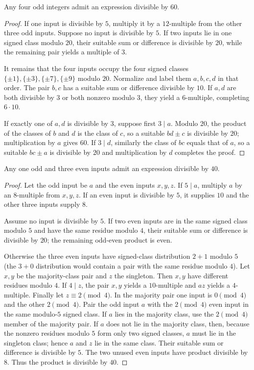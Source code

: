 \begin{theorem}\label{app:fourodd60}
Any four odd integers admit an expression divisible by $60$.
\end{theorem}
\begin{proof}
If one input is divisible by $5$, multiply it by a $12$-multiple from the
other three odd inputs.  Suppose no input is divisible by $5$.  If two inputs
lie in one signed class modulo $20$, their suitable sum or difference is
divisible by $20$, while the remaining pair yields a multiple of $3$.

It remains that the four inputs occupy the four signed classes
$\{\pm1\},\{\pm3\},\{\pm7\},\{\pm9\}$ modulo $20$.  Normalize and label
them $a,b,c,d$ in that order.  The pair $b,c$ has a suitable sum or
difference divisible by $10$.  If $a,d$ are both divisible by $3$ or both
nonzero modulo $3$, they yield a $6$-multiple, completing $6\cdot10$.

If exactly one of $a,d$ is divisible by $3$, suppose first $3\mid a$.
Modulo $20$, the product of the classes of $b$ and $d$ is the class of $c$,
so a suitable $bd\pm c$ is divisible by $20$; multiplication by $a$ gives
$60$.  If $3\mid d$, similarly the class of $bc$ equals that of $a$, so a
suitable $bc\pm a$ is divisible by $20$ and multiplication by $d$ completes
the proof.
\end{proof}

\begin{theorem}\label{app:oneodd40}
Any one odd and three even inputs admit an expression divisible by $40$.
\end{theorem}
\begin{proof}
Let the odd input be $a$ and the even inputs $x,y,z$.  If $5\mid a$, multiply
$a$ by an $8$-multiple from $x,y,z$.  If an even input is divisible by $5$,
it supplies $10$ and the other three inputs supply $8$.

Assume no input is divisible by $5$.  If two even inputs are in the same
signed class modulo $5$ and have the same residue modulo $4$, their suitable
sum or difference is divisible by $20$; the remaining odd-even product is
even.

Otherwise the three even inputs have signed-class distribution $2+1$ modulo
$5$ (the $3+0$ distribution would contain a pair with the same residue
modulo $4$).  Let $x,y$ be the majority-class pair and $z$ the singleton.
Then $x,y$ have different residues modulo $4$.  If $4\mid z$, the pair
$x,y$ yields a $10$-multiple and $az$ yields a $4$-multiple.  Finally let
$z\equiv2\pmod4$.  In the majority pair one input is $0\pmod4$ and the other
$2\pmod4$.  Pair the odd input $a$ with the $2\pmod4$ even input in the same
modulo-$5$ signed class.  If $a$ lies in the majority class, use the
$2\pmod4$ member of the majority pair.  If $a$ does not lie in the majority
class, then, because the nonzero residues modulo $5$ form only two signed
classes, $a$ must lie in the singleton class; hence $a$ and $z$ lie in the
same class.  Their suitable sum or difference is divisible by $5$.
The two unused even inputs have product divisible by $8$.  Thus the product
is divisible by $40$.
\end{proof}

